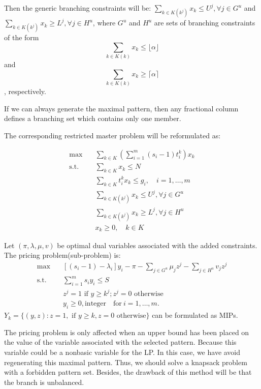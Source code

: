 Then the generic branching constraints will be:
$\sum_{k \in K(k^j)} x_{k} \leq U^{j}, \forall j \in G^u$ and $\sum_{k \in K(k^j)} x_{k} \geq L^{j}, \forall j \in H^u$, where $G^u$ and $H^u$ are sets of branching constraints of the form
\begin{equation}
 \sum_{k \in {K(k)}} x_{k} \leq\lfloor\alpha\rfloor
\end{equation} and
\begin{equation}
\sum_{k \in {K(k)}} x_{k} \geq \lceil\alpha\rceil
\end{equation}, respectively.

If we can always generate the maximal pattern, then any fractional column defines a branching set which contains only one member.

The corresponding restricted master problem will be reformulated as:

\[\begin{split}\mbox{max}\quad & \sum_{k\in K}(\sum_{i=1}^m (s_i-1)t_i^k) x_{k}\\
\mbox{s.t.} \quad & \sum_{k \in K} x_{k} \leq N \\
& \sum_{k \in K} t_i^k x_k \leq g_i,\quad i=1,\ldots,m\\
& \sum_{k \in K(k^j)} x_{k} \leq U^{j}, \forall j \in G^u \\
& \sum_{k \in K(k^j)} x_{k} \geq L^{j}, \forall j \in H^u \\
& x_{k} \geq 0, \quad k \in K
\end{split}\]

Let $(\pi,\lambda,\mu,v)$ be optimal dual variables associated with the added constraints.
The pricing problem(sub-problem) is:
\[\begin{split}\mbox{max}\quad & \left[(s_i-1) -\lambda_i\right] y_{i}- \pi - \sum_{j\in G^u}\mu_j z^j - \sum_{j\in H^u}v_j z^j \\
\mbox{s.t.} \quad & \sum_{i=1}^m s_i y_i \leq S  \\
& z^j =1 \mbox{ if } y \geq k^j; z^j =0 \mbox{ otherwise}  \\
& y_i \geq 0, \mbox{integer}\quad \mbox{for}~ i=1,\ldots,m.
\end{split}\]
$Y_k = \{(y,z): z=1,\text{ if } y \geq k,z=0 \text{ otherwise} \}$ can be formulated as MIPs.

The pricing problem is only affected when an upper bound has been placed on the value of the variable associated with the selected pattern. Because this variable could be a nonbasic variable for the LP. In this case, we have avoid regenerating this maximal pattern. Thus, we should solve a knapsack problem with a forbidden pattern set. Besides, the drawback of this method will be that the branch is unbalanced.

